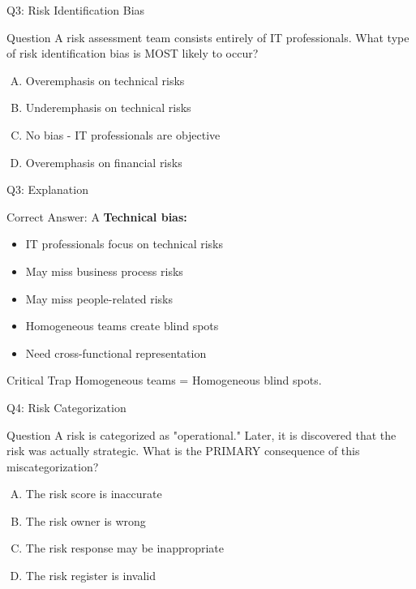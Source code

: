 \documentclass{beamer}
\begin{document}
	\begin{frame}{Q3: Risk Identification Bias}
		\begin{block}{Question}
			A risk assessment team consists entirely of IT professionals. What type of risk identification bias is MOST likely to occur?
		\end{block}
		\begin{enumerate}[(A)]
			\item Overemphasis on technical risks
			\item Underemphasis on technical risks
			\item No bias - IT professionals are objective
			\item Overemphasis on financial risks
		\end{enumerate}
	\end{frame}
	
	\begin{frame}{Q3: Explanation}
		\begin{block}{Correct Answer: A}
			\textbf{Technical bias:}
			\begin{itemize}
				\item IT professionals focus on technical risks
				\item May miss business process risks
				\item May miss people-related risks
				\item Homogeneous teams create blind spots
				\item Need cross-functional representation
			\end{itemize}
		\end{block}
		\begin{alertblock}{Critical Trap}
			Homogeneous teams = Homogeneous blind spots.
		\end{alertblock}
	\end{frame}
	
	\begin{frame}{Q4: Risk Categorization}
		\begin{block}{Question}
			A risk is categorized as "operational." Later, it is discovered that the risk was actually strategic. What is the PRIMARY consequence of this miscategorization?
		\end{block}
		\begin{enumerate}[(A)]
			\item The risk score is inaccurate
			\item The risk owner is wrong
			\item The risk response may be inappropriate
			\item The risk register is invalid
		\end{enumerate}
	\end{frame}
	
\end{document}
